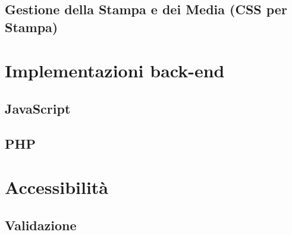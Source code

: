 \documentclass{article}
\begin{document}
\subsection{Gestione della Stampa e dei Media (CSS per Stampa)}


\newpage

\section{Implementazioni back-end}

\subsection{JavaScript}


\subsection{PHP}


\section{Accessibilità}


\subsection{Validazione}
\end{document}

